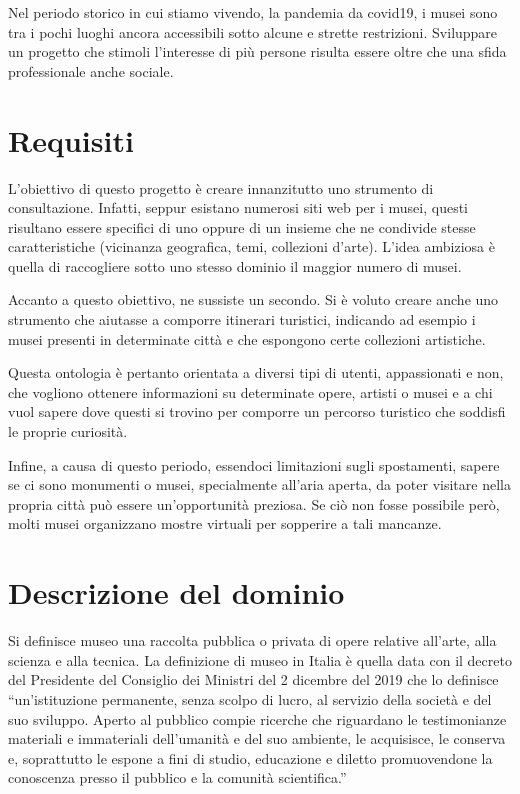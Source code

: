 \documentclass[12pt]{article}
\begin{document}
Nel periodo storico in cui stiamo vivendo, la pandemia da covid19, i musei sono tra i pochi luoghi ancora accessibili sotto alcune e strette restrizioni. Sviluppare un progetto che stimoli l’interesse di più persone risulta essere oltre che una sfida professionale anche sociale.
\section{Requisiti}
L’obiettivo di questo progetto è creare innanzitutto uno strumento di consultazione. Infatti, seppur esistano numerosi siti web per i musei, questi risultano essere specifici di uno oppure di un insieme che ne condivide stesse caratteristiche (vicinanza geografica, temi, collezioni d’arte). 
L’idea ambiziosa è quella di raccogliere sotto uno stesso dominio il maggior numero di musei.

Accanto a questo obiettivo, ne sussiste un secondo. Si è voluto creare anche uno strumento che aiutasse a comporre itinerari turistici, indicando ad esempio i musei presenti in determinate città e che espongono certe collezioni artistiche.

Questa ontologia è pertanto orientata a diversi tipi di utenti, appassionati e non, che vogliono ottenere informazioni su determinate opere, artisti o musei e a chi vuol sapere dove questi si trovino per comporre un percorso turistico che soddisfi le proprie curiosità.

Infine, a causa di questo periodo, essendoci limitazioni sugli spostamenti, sapere se ci sono monumenti o musei, specialmente all’aria aperta, da poter visitare nella propria città può essere un’opportunità preziosa. Se ciò non fosse possibile però, molti musei organizzano mostre virtuali per sopperire a tali mancanze.
\newpage
\section{Descrizione del dominio}
Si definisce museo una raccolta pubblica o privata di opere relative all’arte, alla scienza e alla tecnica. La definizione di museo in Italia è quella data con il decreto del Presidente del Consiglio dei Ministri del 2 dicembre del 2019 che lo definisce “un’istituzione permanente, senza scolpo di lucro, al servizio della società e del suo sviluppo. Aperto al pubblico compie ricerche che riguardano le testimonianze materiali e immateriali dell’umanità e del suo ambiente, le acquisisce, le conserva e, soprattutto le espone a fini di studio, educazione e diletto promuovendone la conoscenza presso il pubblico e la comunità scientifica.” \parencite{def1}
\end{document}
